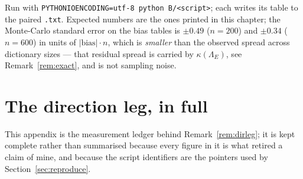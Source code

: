 \documentclass[11pt]{article}
\theoremstyle{remark}
\newcommand{\Le}{\Lambda_E}
\begin{document}
\noindent Run with \texttt{PYTHONIOENCODING=utf-8 python B/<script>}; each writes its
table to the paired \texttt{.txt}. Expected numbers are the ones printed in this chapter;
the Monte-Carlo standard error on the bias tables is $\pm0.49$ ($n=200$) and $\pm0.34$
($n=600$) in units of $|\text{bias}|\!\cdot\!n$, which is \emph{smaller} than the
observed spread across dictionary sizes --- that residual spread is carried by
$\kappa(\Le)$, see Remark~\ref{rem:exact}, and is not sampling noise.

\appendix

\section{The direction leg, in full}\label{app:direction}
This appendix is the measurement ledger behind Remark~\ref{rem:dirleg}; it is kept complete
rather than summarised because every figure in it is what retired a claim of mine, and because
the script identifiers are the pointers used by Section~\ref{sec:reproduce}.
\end{document}
